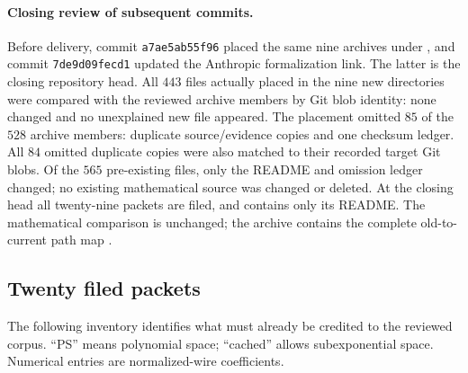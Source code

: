 \paragraph{Closing review of subsequent commits.}
Before delivery, commit \texttt{a7ae5ab55f96}
placed the same nine archives under , and commit
\texttt{7de9d09fecd1} updated the Anthropic
formalization link. The latter is the closing repository head. All $443$
files actually placed in the nine new directories were compared with the
reviewed archive members by Git blob identity: none changed and no unexplained
new file appeared. The placement omitted $85$ of the $528$ archive members:
duplicate source/evidence copies and one checksum ledger. All $84$ omitted
duplicate copies were also matched to their recorded target Git blobs.
Of the $565$ pre-existing files, only the README and omission ledger changed;
no existing mathematical source was changed or deleted. At the closing
head all twenty-nine packets are filed, and  contains
only its README. The mathematical comparison is unchanged; the archive
contains the complete old-to-current path map \cite{closing}.

\subsection{Twenty filed packets}
The following inventory identifies what must already be credited to the
reviewed corpus. ``PS'' means polynomial space; ``cached'' allows
subexponential space. Numerical entries are normalized-wire coefficients.

